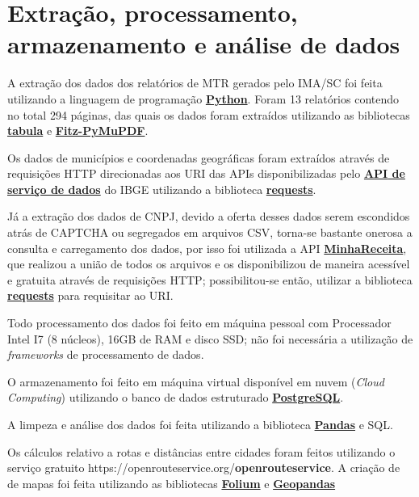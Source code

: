 \section{Extração, processamento, armazenamento e análise de dados}

A extração dos dados dos relatórios de \gls{MTR} gerados pelo \gls{IMA/SC} foi feita utilizando a linguagem de programação \href{https://www.python.org/}{\textbf{Python}}. Foram 13 relatórios contendo no total 294 páginas, das quais os dados foram extraídos utilizando as bibliotecas \href{https://tabula.technology/}{\textbf{tabula}} e \href{https://pymupdf.readthedocs.io/en/latest/}{\textbf{Fitz-PyMuPDF}}.

Os dados de municípios e coordenadas geográficas foram extraídos através de requisições \gls{HTTP} direcionadas aos \gls{URI} das \gls{API}s disponibilizadas pelo \href{https://servicodados.ibge.gov.br/api/docs/}{\textbf{\gls{API} de serviço de dados}} do \gls{IBGE} utilizando a biblioteca \href{https://pypi.org/project/requests/}{\textbf{requests}}.

Já a extração dos dados de \gls{CNPJ}, devido a oferta desses dados serem escondidos atrás de \gls{CAPTCHA} ou segregados em arquivos \gls{CSV}, torna-se bastante onerosa a consulta e carregamento dos dados, por isso foi utilizada a \gls{API} \href{https://docs.minhareceita.org/}{\textbf{MinhaReceita}}, que realizou a união de todos os arquivos e os disponibilizou de maneira acessível e gratuita através de requisições \gls{HTTP}; possibilitou-se então, utilizar a biblioteca \href{https://pypi.org/project/requests/}{\textbf{requests}} para requisitar ao \gls{URI}.

Todo processamento dos dados foi feito em máquina pessoal com Processador Intel I7 (8 núcleos), 16GB de \gls{RAM} e disco \gls{SSD}; não foi necessária a utilização de \textit{frameworks} de processamento de dados.

O armazenamento foi feito em máquina virtual disponível em nuvem (\textit{Cloud Computing}) utilizando o banco de dados estruturado \href{https://www.postgresql.org/}{\textbf{PostgreSQL}}.

A limpeza e análise dos dados foi feita utilizando a biblioteca \href{https://pandas.pydata.org/}{\textbf{Pandas}} e \gls{SQL}.

Os cálculos relativo a rotas e distâncias entre cidades foram feitos utilizando o serviço gratuito {https://openrouteservice.org/}{\textbf{openrouteservice}}. A criação de de mapas foi feita utilizando as bibliotecas \href{https://pypi.org/project/folium/}{\textbf{Folium}} e \href{https://geopandas.org/en/stable/}{\textbf{Geopandas}}

